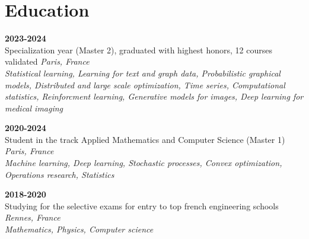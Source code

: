 \section{Education}
\vspace{0.1cm}

  \hfill \textbf{2023-2024}\\
Specialization year (Master 2), graduated with highest honors, 12 courses validated \hfill \textit{Paris, France}\\
\textit{Statistical learning, Learning for text and graph data, Probabilistic graphical models, Distributed and large scale optimization, Time series, Computational statistics, Reinforcment learning, Generative models for images, Deep learning for medical imaging}

\vspace{0.1cm}

  \hfill \textbf{2020-2024}\\
Student in the track Applied Mathematics and Computer Science (Master 1) \hfill \textit{Paris, France}\\
\textit{Machine learning, Deep learning, Stochastic processes, Convex optimization, Operations research, Statistics}

\vspace{0.1cm}

 \hfill \textbf{2018-2020}\\
Studying for the selective exams for entry to top french engineering schools \hfill \textit{Rennes, France}\\
\textit{Mathematics, Physics, Computer science}\\
